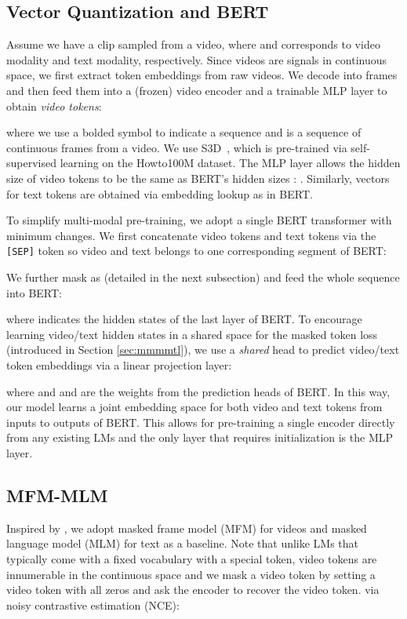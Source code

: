 \documentclass[11pt,a4paper]{article}
\begin{document}
\subsection{Vector Quantization and BERT}
Assume we have a clip  sampled from a video, where  and  corresponds to video modality and text modality, respectively.
Since videos are signals in continuous space, we first extract token embeddings from raw videos.
We decode  into frames and then feed them into a (frozen) video encoder  and a trainable MLP layer to obtain \textit{video tokens}:

where we use a bolded symbol to indicate a sequence and  is a sequence of continuous frames from a video. 
We use S3D~\cite{xie2018rethinking,miech2020end}, which is pre-trained via self-supervised learning on the Howto100M dataset.
The MLP layer allows the hidden size of video tokens to be the same as BERT's hidden sizes : .
Similarly, vectors for text tokens  are obtained via embedding lookup as in BERT.

To simplify multi-modal pre-training, we adopt a single BERT transformer with minimum changes.
We first concatenate video tokens  and text tokens  via the \texttt{[SEP]} token so video and text belongs to one corresponding segment of BERT:

We further mask  as  (detailed in the next subsection) and feed the whole sequence into BERT:

where  indicates the hidden states of the last layer of BERT.
To encourage learning video/text hidden states in a shared space for the masked token loss (introduced in Section \ref{sec:mmmmtl}), 
we use a \textit{shared} head to predict video/text token embeddings via a linear projection layer:

where  and  and  are the weights from the prediction heads of BERT.
In this way, our model learns a joint embedding space for both video and text tokens from inputs to outputs of BERT.
This allows for pre-training a single encoder directly from any existing LMs and the only layer that requires initialization is the MLP layer.

\subsection{MFM-MLM}
Inspired by \cite{sun2019contrastive,li-etal-2020-hero,luo2020univilm}, we adopt masked frame model (MFM) for videos and masked language model (MLM) for text as a baseline.
Note that unlike LMs that typically come with a fixed vocabulary with a special  token, video tokens are innumerable in the continuous space and we mask a video token by setting a video token with all zeros and ask the encoder to recover the video token.
via noisy contrastive estimation (NCE): 
\end{document}
